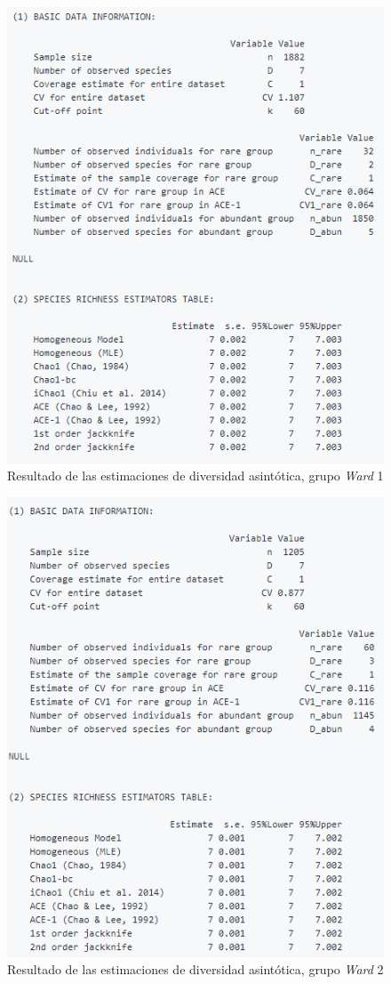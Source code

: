 \documentclass[11pt,]{article}
\begin{document}
\begin{figure}
\centering
\includegraphics{asintotico_ward1.png}
\caption{Resultado de las estimaciones de diversidad asintótica, grupo
\emph{Ward} 1 \label{fig:asintotico_ward1}}
\end{figure}

\begin{figure}
\centering
\includegraphics{asintotico_ward2.png}
\caption{Resultado de las estimaciones de diversidad asintótica, grupo
\emph{Ward} 2 \label{fig:asintotico_ward2}}
\end{figure}
\end{document}
